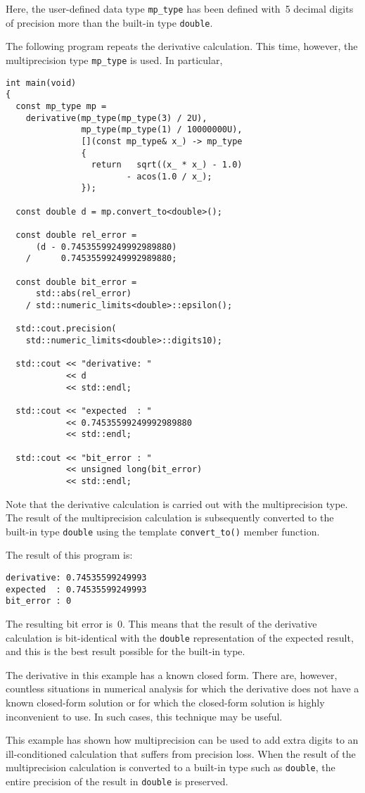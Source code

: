 \documentclass{article}[10pt]
\begin{document}
Here, the user-defined data type {\lstinline|mp_type|}
has been defined with~5 decimal digits of precision
more than the built-in type {\lstinline|double|}.

The following program repeats the derivative calculation.
This time, however, the multiprecision type {\lstinline|mp_type|}
is used. In particular,

\begin{lstlisting}
int main(void)
{
  const mp_type mp =
    derivative(mp_type(mp_type(3) / 2U),
               mp_type(mp_type(1) / 10000000U),
               [](const mp_type& x_) -> mp_type
               {
                 return   sqrt((x_ * x_) - 1.0)
                        - acos(1.0 / x_);
               });

  const double d = mp.convert_to<double>();

  const double rel_error =
      (d - 0.74535599249992989880)
    /      0.74535599249992989880;

  const double bit_error = 
      std::abs(rel_error)
    / std::numeric_limits<double>::epsilon();

  std::cout.precision(
    std::numeric_limits<double>::digits10);

  std::cout << "derivative: "
            << d
            << std::endl;

  std::cout << "expected  : "
            << 0.74535599249992989880
            << std::endl;

  std::cout << "bit_error : "
            << unsigned long(bit_error)
            << std::endl;
\end{lstlisting}

Note that the derivative calculation is carried out
with the multiprecision type. The result of the
multiprecision calculation is subsequently converted to
the built-in type {\lstinline|double|} using the
template {\lstinline|convert_to()|} member function.

The result of this program is:

\begin{lstlisting}
derivative: 0.74535599249993
expected  : 0.74535599249993
bit_error : 0
\end{lstlisting}

The resulting bit error is~0. This means that
the result of the derivative calculation is bit-identical
with the {\lstinline|double|} representation of the
expected result, and this is the best result possible
for the built-in type.

The derivative in this example has a known closed form.
There are, however, countless situations in numerical
analysis for which the derivative does not have a known
closed-form solution or for which the closed-form solution
is highly inconvenient to use. In such cases, this technique
may be useful.

This example has shown how multiprecision can be used
to add extra digits to an ill-conditioned calculation
that suffers from precision loss. When the result of the
multiprecision calculation is converted to a built-in type
such as {\lstinline|double|}, the entire precision of the
result in {\lstinline|double|} is preserved.
\end{document}
